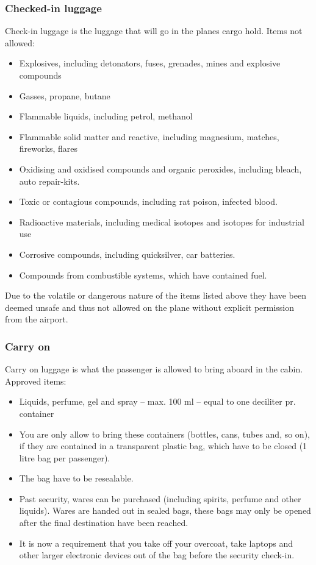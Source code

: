 \subsubsection{Checked-in luggage}
Check-in luggage is the luggage that will go in the planes cargo hold.
\newline 
Items not allowed:
\begin{itemize}
\item Explosives, including detonators, fuses, grenades, mines and explosive compounds
\item Gasses, propane, butane
\item Flammable liquids, including petrol, methanol
\item Flammable solid matter and reactive, including magnesium, matches, fireworks, flares
\item Oxidising and oxidised compounds and organic peroxides, including bleach, auto repair-kits.
\item Toxic or contagious compounds, including rat poison, infected blood.
\item Radioactive materials, including medical isotopes and isotopes for industrial use
\item Corrosive compounds, including quicksilver, car batteries.
\item Compounds from combustible systems, which have contained fuel.
\end{itemize}
Due to the volatile or dangerous nature of the items listed above they have been deemed unsafe and thus not allowed on the plane without explicit permission from the airport.

\subsubsection{Carry on}
Carry on luggage is what the passenger is allowed to bring aboard in the cabin.
\newline
Approved items:
\begin{itemize}
\item Liquids, perfume, gel and spray – max. 100 ml – equal to one deciliter pr. container
\item You are only allow to bring these containers (bottles, cans, tubes and, so on), if they are contained in a transparent plastic bag, which have to be closed (1 litre bag per passenger).
\item The bag have to be resealable.
\item Past security, wares can be purchased (including spirits, perfume and other liquids). Wares are handed out in sealed bags, these bags may only be opened after the final destination have been reached.
\item It is now a requirement that you take off your overcoat, take laptops and other larger electronic devices out of the bag before the security check-in.\\
\citep{Prohibited_luggage}
\end{itemize}

